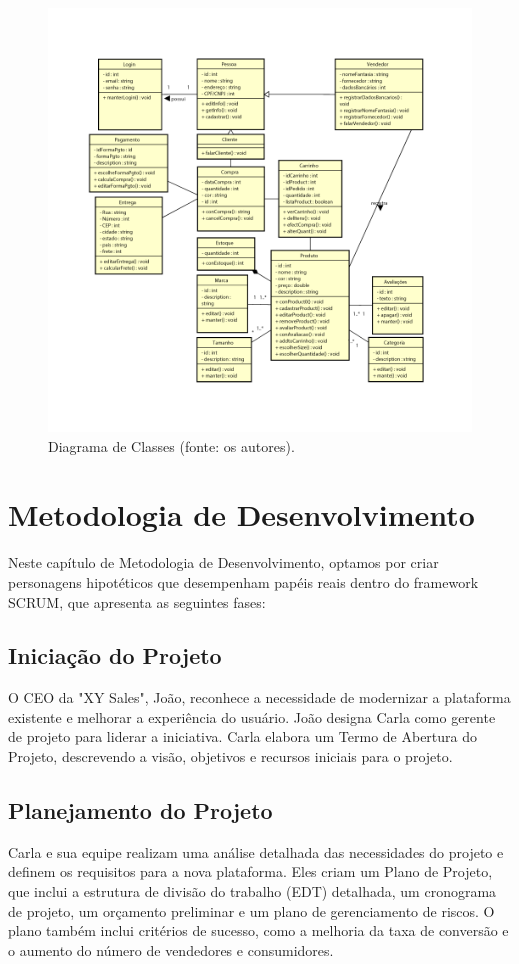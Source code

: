 \documentclass[
	12pt,				%
	openright,			%
	twoside,			%
	a4paper,			%
	english,			%
	brazil				%
	]{abntex2}
\begin{document}
\begin{figure}[htb]
	\centering
	\includegraphics[width=1\textwidth]{img/diagrama-de-classes}
	\caption{Diagrama de Classes (fonte: os autores).}
	\label{fig:diagrama-de-classes}
\end{figure}

\section{Metodologia de Desenvolvimento}

Neste capítulo de Metodologia de Desenvolvimento, optamos por criar personagens hipotéticos que desempenham papéis reais dentro do framework SCRUM, que apresenta as seguintes fases:

\subsection{Iniciação do Projeto}
O CEO da "XY Sales", João, reconhece a necessidade de modernizar a plataforma existente e melhorar a experiência do usuário. João designa Carla como gerente de projeto para liderar a iniciativa. Carla elabora um Termo de Abertura do Projeto, descrevendo a visão, objetivos e recursos iniciais para o projeto.

\subsection{Planejamento do Projeto}
Carla e sua equipe realizam uma análise detalhada das necessidades do projeto e definem os requisitos para a nova plataforma. Eles criam um Plano de Projeto, que inclui a estrutura de divisão do trabalho (EDT) detalhada, um cronograma de projeto, um orçamento preliminar e um plano de gerenciamento de riscos. O plano também inclui critérios de sucesso, como a melhoria da taxa de conversão e o aumento do número de vendedores e consumidores.
\end{document}
